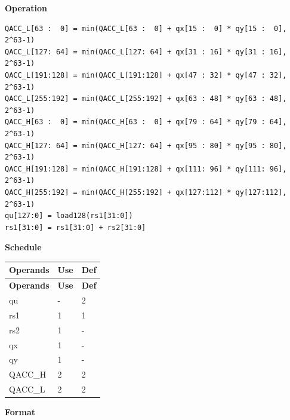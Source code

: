 \textbf{Operation}\\
\begin{lstlisting}
QACC_L[63 :  0] = min(QACC_L[63 :  0] + qx[15 :  0] * qy[15 :  0], 2^63-1)
QACC_L[127: 64] = min(QACC_L[127: 64] + qx[31 : 16] * qy[31 : 16], 2^63-1)
QACC_L[191:128] = min(QACC_L[191:128] + qx[47 : 32] * qy[47 : 32], 2^63-1)
QACC_L[255:192] = min(QACC_L[255:192] + qx[63 : 48] * qy[63 : 48], 2^63-1)
QACC_H[63 :  0] = min(QACC_H[63 :  0] + qx[79 : 64] * qy[79 : 64], 2^63-1)
QACC_H[127: 64] = min(QACC_H[127: 64] + qx[95 : 80] * qy[95 : 80], 2^63-1)
QACC_H[191:128] = min(QACC_H[191:128] + qx[111: 96] * qy[111: 96], 2^63-1)
QACC_H[255:192] = min(QACC_H[255:192] + qx[127:112] * qy[127:112], 2^63-1)
qu[127:0] = load128(rs1[31:0])
rs1[31:0] = rs1[31:0] + rs2[31:0]
\end{lstlisting}

\textbf{Schedule}\\
\begin{longtable}[c]{|l|l|l|}
    \hline
    \rowcolor{lightgray}
    \textbf{Operands} & \textbf{Use} & \textbf{Def} \\\hline
    \endfirsthead
    \hline
    \rowcolor{lightgray}
     \textbf{Operands} & \textbf{Use} & \textbf{Def} \\\hline
    \endhead
    \hline
    \endfoot

    qu & - & 2 \\\hline
    rs1 & 1 & 1 \\\hline
    rs2 & 1 & - \\\hline
     qx & 1 & - \\\hline
     qy & 1 & - \\\hline
     QACC\_H & 2 & 2 \\\hline
     QACC\_L & 2 & 2

\end{longtable}

\textbf{Format}\\

